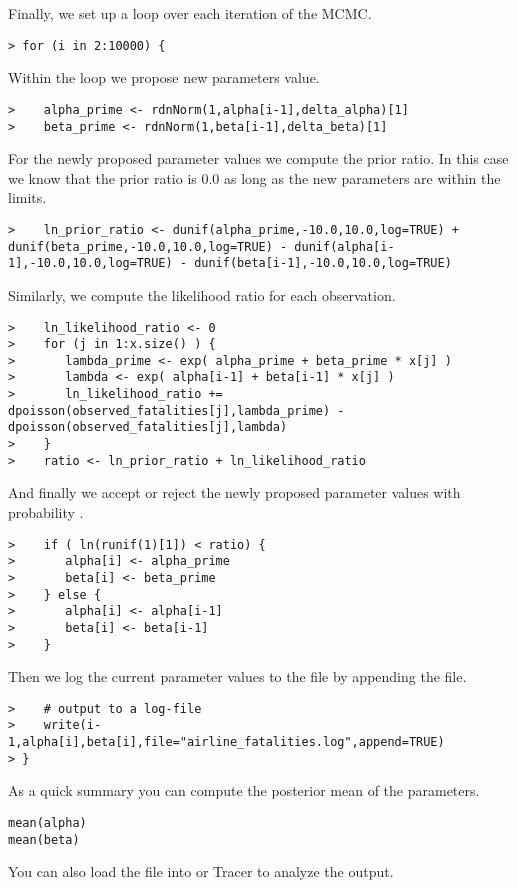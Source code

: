 Finally, we set up a  loop over each iteration of the MCMC.
{\tt \begin{snugshade*}
\begin{lstlisting}    
> for (i in 2:10000) {
\end{lstlisting}
\end{snugshade*}}
Within the  loop we propose new parameters value.
{\tt \begin{snugshade*}
\begin{lstlisting}    
>    alpha_prime <- rdnNorm(1,alpha[i-1],delta_alpha)[1]
>    beta_prime <- rdnNorm(1,beta[i-1],delta_beta)[1]
\end{lstlisting}
\end{snugshade*}}
For the newly proposed parameter values we compute the prior ratio.
In this case we know that the prior ratio is 0.0 as long as the new parameters are within the limits.
{\tt \begin{snugshade*}
\begin{lstlisting}    
>    ln_prior_ratio <- dunif(alpha_prime,-10.0,10.0,log=TRUE) + dunif(beta_prime,-10.0,10.0,log=TRUE) - dunif(alpha[i-1],-10.0,10.0,log=TRUE) - dunif(beta[i-1],-10.0,10.0,log=TRUE)
\end{lstlisting}
\end{snugshade*}}
Similarly, we compute the likelihood ratio for each observation.
{\tt \begin{snugshade*}
\begin{lstlisting}    
>    ln_likelihood_ratio <- 0
>    for (j in 1:x.size() ) {
>       lambda_prime <- exp( alpha_prime + beta_prime * x[j] )
>       lambda <- exp( alpha[i-1] + beta[i-1] * x[j] )
>       ln_likelihood_ratio += dpoisson(observed_fatalities[j],lambda_prime) - dpoisson(observed_fatalities[j],lambda)
>    }
>    ratio <- ln_prior_ratio + ln_likelihood_ratio
\end{lstlisting}
\end{snugshade*}}
And finally we accept or reject the newly proposed parameter values with probability .
{\tt \begin{snugshade*}
\begin{lstlisting}    
>    if ( ln(runif(1)[1]) < ratio) {
>       alpha[i] <- alpha_prime
>       beta[i] <- beta_prime
>    } else {
>       alpha[i] <- alpha[i-1]
>       beta[i] <- beta[i-1]
>    }
\end{lstlisting}
\end{snugshade*}}
Then we log the current parameter values to the file by appending the file.
{\tt \begin{snugshade*}
\begin{lstlisting}    
>    # output to a log-file
>    write(i-1,alpha[i],beta[i],file="airline_fatalities.log",append=TRUE)
> }
\end{lstlisting}
\end{snugshade*}}
As a quick summary you can compute the posterior mean of the parameters.
{\tt \begin{snugshade*}
\begin{lstlisting}    
mean(alpha)
mean(beta)
\end{lstlisting}
\end{snugshade*}}
You can also load the file into \R or Tracer to analyze the output.


